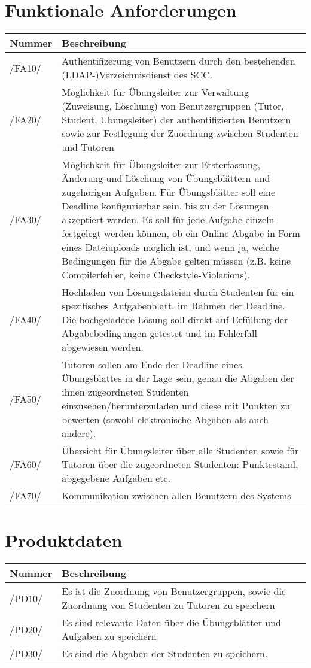 \documentclass[a4paper,10pt]{article}
\newcommand\addrow[2]{#1 &#2\\ }
\newcommand\addheading[2]{#1 &#2\\ \hline}
\newcommand\tabularhead{\begin{tabular}{lp{13cm}}
\hline
}
\newenvironment{usecase}{\tabularhead}
{\hline\end{tabular}}
\begin{document}
\section{Funktionale Anforderungen}
\begin{usecase}

\addheading{Nummer}{Beschreibung}
\addrow{/FA10/} {Authentifizerung von Benutzern durch den bestehenden (LDAP-)Verzeichnisdienst des SCC.}
\addrow{/FA20/} {Möglichkeit für Übungsleiter zur Verwaltung (Zuweisung, Löschung) von Benutzergruppen (Tutor, Student, Übungsleiter) der authentifizierten Benutzern sowie zur Festlegung der Zuordnung zwischen Studenten und Tutoren}
\addrow{/FA30/} {Möglichkeit für Übungsleiter zur Ersterfassung, Änderung und Löschung von Übungsblättern und zugehörigen Aufgaben.  Für Übungsblätter soll eine Deadline konfigurierbar sein, bis zu der Lösungen akzeptiert werden.  Es soll für jede Aufgabe einzeln festgelegt werden können, ob ein Online-Abgabe in Form eines Dateiuploads möglich ist, und wenn ja, welche Bedingungen für die Abgabe gelten müssen (z.B. keine Compilerfehler, keine Checkstyle-Violations).}
\addrow{/FA40/} {Hochladen von Lösungsdateien durch Studenten für ein spezifisches Aufgabenblatt, im Rahmen der Deadline. Die hochgeladene Lösung soll direkt auf Erfüllung der Abgabebedingungen getestet und im Fehlerfall abgewiesen werden.}
\addrow{/FA50/} {Tutoren sollen am Ende der Deadline eines Übungsblattes in der Lage sein, genau die Abgaben der ihnen zugeordneten Studenten einzusehen/herunterzuladen und diese mit Punkten zu bewerten (sowohl elektronische Abgaben als auch andere).}
\addrow{/FA60/} {Übersicht für Übungsleiter über alle Studenten sowie für Tutoren über die zugeordneten Studenten: Punktestand, abgegebene Aufgaben etc.}
\addrow{/FA70/} {Kommunikation zwischen allen Benutzern des Systems}

\end{usecase}

\section{Produktdaten}
\begin{usecase}

\addheading{Nummer}{Beschreibung}
\addrow{/PD10/} {Es ist die Zuordnung von Benutzergruppen, sowie die Zuordnung von Studenten zu Tutoren zu speichern}
\addrow{/PD20/} {Es sind relevante Daten über die Übungsblätter und Aufgaben zu speichern}
\addrow{/PD30/} {Es sind die Abgaben der Studenten zu speichern.}

\end{usecase}
\end{document}
